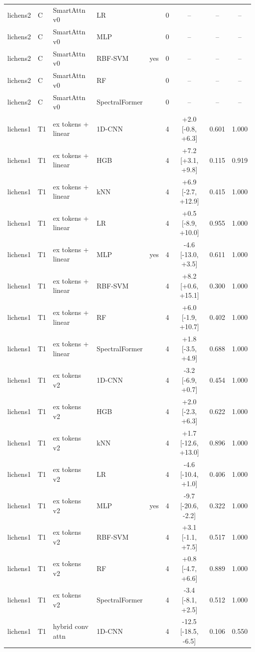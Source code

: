 \begin{tabular}{lllllcccc}
lichens2 & C & SmartAttn v0 & LR &  & 0 & -- & -- & -- \\
lichens2 & C & SmartAttn v0 & MLP &  & 0 & -- & -- & -- \\
lichens2 & C & SmartAttn v0 & RBF-SVM & yes & 0 & -- & -- & -- \\
lichens2 & C & SmartAttn v0 & RF &  & 0 & -- & -- & -- \\
lichens2 & C & SmartAttn v0 & SpectralFormer &  & 0 & -- & -- & -- \\
lichens1 & T1 & ex tokens + linear & 1D-CNN &  & 4 & +2.0 [-0.8, +6.3] & 0.601 & 1.000 \\
lichens1 & T1 & ex tokens + linear & HGB &  & 4 & +7.2 [+3.1, +9.8] & 0.115 & 0.919 \\
lichens1 & T1 & ex tokens + linear & kNN &  & 4 & +6.9 [-2.7, +12.9] & 0.415 & 1.000 \\
lichens1 & T1 & ex tokens + linear & LR &  & 4 & +0.5 [-8.9, +10.0] & 0.955 & 1.000 \\
lichens1 & T1 & ex tokens + linear & MLP & yes & 4 & -4.6 [-13.0, +3.5] & 0.611 & 1.000 \\
lichens1 & T1 & ex tokens + linear & RBF-SVM &  & 4 & +8.2 [+0.6, +15.1] & 0.300 & 1.000 \\
lichens1 & T1 & ex tokens + linear & RF &  & 4 & +6.0 [-1.9, +10.7] & 0.402 & 1.000 \\
lichens1 & T1 & ex tokens + linear & SpectralFormer &  & 4 & +1.8 [-3.5, +4.9] & 0.688 & 1.000 \\
lichens1 & T1 & ex tokens v2 & 1D-CNN &  & 4 & -3.2 [-6.9, +0.7] & 0.454 & 1.000 \\
lichens1 & T1 & ex tokens v2 & HGB &  & 4 & +2.0 [-2.3, +6.3] & 0.622 & 1.000 \\
lichens1 & T1 & ex tokens v2 & kNN &  & 4 & +1.7 [-12.6, +13.0] & 0.896 & 1.000 \\
lichens1 & T1 & ex tokens v2 & LR &  & 4 & -4.6 [-10.4, +1.0] & 0.406 & 1.000 \\
lichens1 & T1 & ex tokens v2 & MLP & yes & 4 & -9.7 [-20.6, -2.2] & 0.322 & 1.000 \\
lichens1 & T1 & ex tokens v2 & RBF-SVM &  & 4 & +3.1 [-1.1, +7.5] & 0.517 & 1.000 \\
lichens1 & T1 & ex tokens v2 & RF &  & 4 & +0.8 [-4.7, +6.6] & 0.889 & 1.000 \\
lichens1 & T1 & ex tokens v2 & SpectralFormer &  & 4 & -3.4 [-8.1, +2.5] & 0.512 & 1.000 \\
lichens1 & T1 & hybrid conv attn & 1D-CNN &  & 4 & -12.5 [-18.5, -6.5] & 0.106 & 0.550 \\

\end{tabular}
